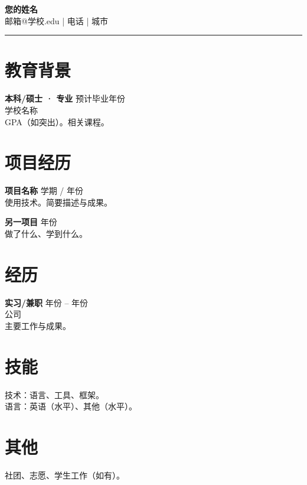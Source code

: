 \documentclass[11pt,a4paper]{article}
\begin{document}
\begin{center}
{\LARGE \textbf{您的姓名}}\\[0.2em]
邮箱@学校.edu \quad | \quad 电话 \quad | \quad 城市
\end{center}
\begin{flushright}\rule{2cm}{2.5cm}\end{flushright}
\vspace{0.4em}
\section*{教育背景}
\textbf{本科/硕士 · 专业} \hfill 预计毕业年份 \\
学校名称 \\
GPA（如突出）。相关课程。

\section*{项目经历}
\textbf{项目名称} \hfill 学期 / 年份 \\
使用技术。简要描述与成果。

\textbf{另一项目} \hfill 年份 \\
做了什么、学到什么。

\section*{经历}
\textbf{实习/兼职} \hfill 年份 -- 年份 \\
公司 \\
主要工作与成果。

\section*{技能}
技术：语言、工具、框架。 \\
语言：英语（水平）、其他（水平）。

\section*{其他}
社团、志愿、学生工作（如有）。
\end{document}
